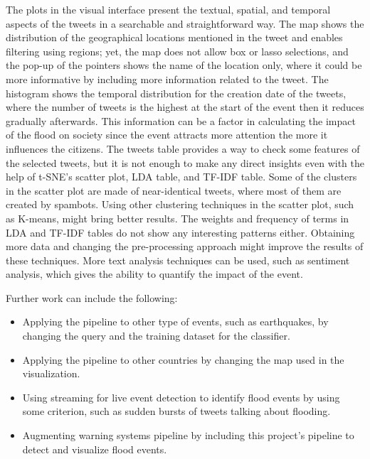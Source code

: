 The plots in the visual interface present the textual, spatial, and temporal aspects of the
tweets in a searchable and straightforward way. The map shows the distribution of the geographical
locations mentioned in the tweet and enables filtering using regions; yet, the map does not allow box
or lasso selections, and the pop-up of the pointers shows the name of the location only, where it
could be more informative by including more information related to the tweet. The histogram shows
the temporal distribution for the creation date of the tweets, where the number of tweets is the
highest at the start of the event then it reduces gradually afterwards. This information can be a
factor in calculating the impact of the flood on society since the event attracts more attention the
more it influences the citizens. The tweets table provides a way to check some features of the
selected tweets, but it is not enough to make any direct insights even with the help of \ac{t-SNE}'s
scatter plot, \ac{LDA} table, and \ac{TF-IDF} table. Some of the clusters in the scatter plot are
made of near-identical tweets, where most of them are created by spambots. Using other
clustering techniques in the scatter plot, such as K-means, might bring better results. The weights
and frequency of terms in \ac{LDA} and \ac{TF-IDF} tables do not show any interesting patterns
either. Obtaining more data and changing the pre-processing approach might improve the results of
these techniques. More text analysis techniques can be used, such as sentiment analysis, which gives
the ability to quantify the impact of the event.


Further work can include the following:
\begin{itemize}
  \item Applying the pipeline to other type of events, such as earthquakes, by changing the query
    and the training dataset for the classifier.
\item Applying the pipeline to other countries by changing the map used in the visualization.
\item Using streaming for live event detection to identify flood events by using some criterion,
  such as sudden bursts of tweets talking about flooding.
\item Augmenting warning systems pipeline by including this project's pipeline to detect and visualize flood events.
\end{itemize}
